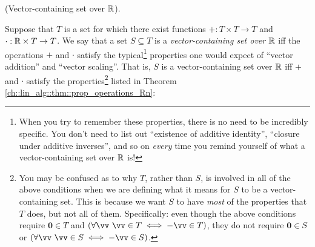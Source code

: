 \begin{defn}
\label{ch::lin_alg::defn::vector_containing_set_R}
    (Vector-containing set over $\mathbb{R}$).
    
    Suppose that $T$ is a set for which there exist functions $+:T \times T \rightarrow T$ and $\cdot:\mathbb{R} \times T \rightarrow T$. We say that a set $S \subseteq T$ is a \textit{vector-containing set over $\mathbb{R}$} iff the operations $+$ and $\cdot$ satisfy the typical\footnote{When you try to remember these properties, there is no need to be incredibly specific. You don't need to list out ``existence of additive identity'', ``closure under additive inverses'', and so on \textit{every} time you remind yourself of what a vector-containing set over $\mathbb{R}$ is!} properties one would expect of ``vector addition'' and ``vector scaling''. That is, $S$ is a vector-containing set over $\mathbb{R}$ iff $+$ and $\cdot$ satisfy the properties\footnote{You may be confused as to why $T$, rather than $S$, is involved in all of the above conditions when we are defining what it means for $S$ to be a vector-containing set. This is because we want $S$ to have \textit{most} of the properties that $T$ does, but not all of them. Specifically: even though the above conditions require $\mathbf{0} \in T$ and $(\forall \vv \spc \vv \in T \iff -\vv \in T)$, they do not require $\mathbf{0} \in S$ or $(\forall \vv \spc \vv \in S \iff -\vv \in S)$.} listed in Theorem \ref{ch::lin_alg::thm::prop_operations_Rn}:
    

\end{defn}
